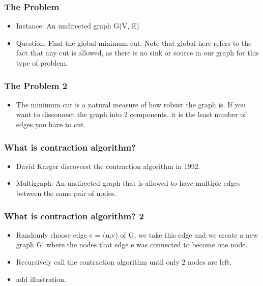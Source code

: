 \documentclass{beamer}
\begin{document}
\begin{frame}
\frametitle{The Problem}
\begin{itemize}
		\item Instance: An undirected graph G(V, E)
		\item Question: Find the global minimum cut. Note that global here refers to the fact that any cut is allowed, as there is no sink or source in our graph for this type of problem.
\end{itemize}
\end{frame}

\begin{frame}
\frametitle{The Problem 2}
\begin{itemize}
		\item The minimum cut is a natural measure of how robust the graph is. If you want to disconnect the graph into 2 components, it is the least number of edges you have to cut.
\end{itemize}
\end{frame}

\begin{frame}
\frametitle{What is contraction algorithm?}
\begin{itemize}
	\item David Karger discoverst the contraction algorithm in 1992.
	\item Multigraph: An undirected graph that is allowed to have multiple edges between the same pair of nodes.
\end{itemize}
\end{frame}

\begin{frame}
\frametitle{What is contraction algorithm? 2}
\begin{itemize}
	\item Randomly choose edge e = (u,v) of G, we take this edge and we create a new graph G' where the nodes that edge e was connected to become one node. 
	\item Recursively call the contraction algorithm until only 2 nodes are left. 
	\item add illustration.
\end{itemize}
\end{frame}
\end{document}
